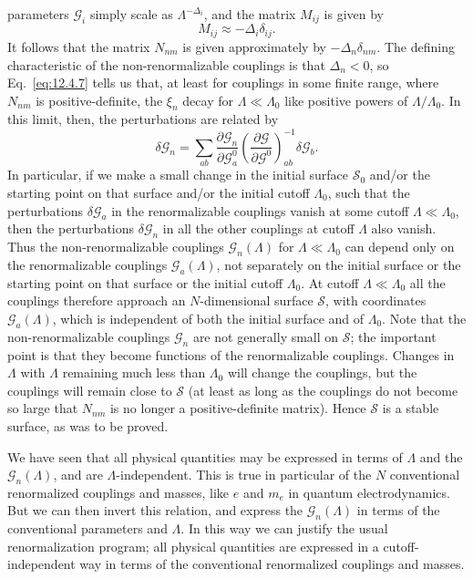 parameters $\mathcal G_i$ simply scale as $\Lambda^{-\Delta_i}$, and the matrix
$M_{ij}$ is given by
\begin{equation}
M_{ij}\approx-\Delta_i\delta_{ij}.
\tag{12.4.9}\label{eq:12.4.9}
\end{equation}
It follows that the matrix $N_{nm}$ is given approximately by
$-\Delta_n\delta_{nm}$. The defining characteristic of the
non-renormalizable couplings is that $\Delta_n<0$, so Eq.~\eqref{eq:12.4.7}
tells us that, at least for couplings in some finite range, where $N_{nm}$ is
positive-definite, the $\xi_n$ decay for $\Lambda\ll\Lambda_0$ like positive
powers of $\Lambda/\Lambda_0$. In this limit, then, the perturbations are
related by
\begin{equation}
\delta\mathcal G_n=\sum_{ab}
\frac{\partial\mathcal G_n}{\partial\mathcal G_a^0}
\left(\frac{\partial\mathcal G}{\partial\mathcal G^0}\right)^{-1}_{ab}
\delta\mathcal G_b.
\tag{12.4.10}\label{eq:12.4.10}
\end{equation}
In particular, if we make a small change in the initial surface $\mathcal S_0$
and/or the starting point on that surface and/or the initial cutoff
$\Lambda_0$, such that the perturbations $\delta\mathcal G_a$ in the
renormalizable couplings vanish at some cutoff $\Lambda\ll\Lambda_0$, then the
perturbations $\delta\mathcal G_n$ in all the other couplings at cutoff
$\Lambda$ also vanish. Thus the non-renormalizable couplings
$\mathcal G_n(\Lambda)$ for $\Lambda\ll\Lambda_0$ can depend only on the
renormalizable couplings $\mathcal G_a(\Lambda)$, not separately on the initial
surface or the starting point on that surface or the initial cutoff
$\Lambda_0$. At cutoff $\Lambda\ll\Lambda_0$ all the couplings therefore
approach an $N$-dimensional surface $\mathcal S$, with coordinates
$\mathcal G_a(\Lambda)$, which is independent of both the initial surface and
of $\Lambda_0$. Note that the non-renormalizable couplings $\mathcal G_n$ are
not generally small on $\mathcal S$; the important point is that they become
functions of the renormalizable couplings. Changes in $\Lambda$ with $\Lambda$
remaining much less than $\Lambda_0$ will change the couplings, but the
couplings will remain close to $\mathcal S$ (at least as long as the couplings
do not become so large that $N_{nm}$ is no longer a positive-definite matrix).
Hence $\mathcal S$ is a stable surface, as was to be proved.

We have seen that all physical quantities may be expressed in terms of
$\Lambda$ and the $\mathcal G_n(\Lambda)$, and are $\Lambda$-independent. This
is true in particular of the $N$ conventional renormalized couplings and
masses, like $e$ and $m_e$ in quantum electrodynamics. But we can then invert
this relation, and express the $\mathcal G_n(\Lambda)$ in terms of the
conventional parameters and $\Lambda$. In this way we can justify the usual
renormalization program; all physical quantities are expressed in a
cutoff-independent way in terms of the conventional renormalized couplings and
masses.

